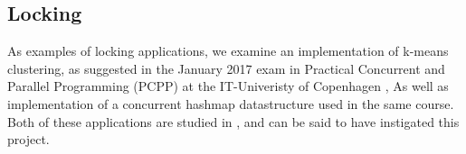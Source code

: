 

\subsection{Locking }
As examples of locking applications, we examine an implementation of k-means
clustering, as suggested in the January 2017 exam in Practical Concurrent and
Parallel Programming (PCPP) at the IT-Univeristy of Copenhagen \cite{kmeansexam,
kmeansexamcode}, As well as implementation of a concurrent hashmap datastructure
used in the same course. Both of these applications are studied in
\cite{mystery}, and can be said to have instigated this project.

